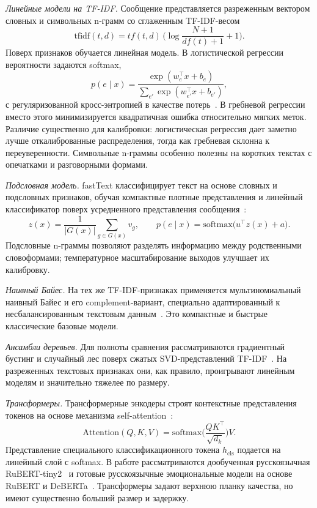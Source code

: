 \documentclass[12pt,a4paper]{report}
\begin{document}
\emph{Линейные модели на TF-IDF.} Сообщение представляется разреженным вектором словных и символьных n-грамм со сглаженным TF-IDF-весом
\[
  \mathrm{tfidf}(t,d) = tf(t,d)\,\Big(\log\frac{N+1}{df(t)+1} + 1\Big).
\]
Поверх признаков обучается линейная модель. В логистической регрессии вероятности задаются softmax,
\[
  p(e\mid x) = \frac{\exp(w_e^\top x + b_e)}{\sum_{e'} \exp(w_{e'}^\top x + b_{e'})},
\]
с регуляризованной кросс-энтропией в качестве потерь~\cite{cox1958logistic,hastie2009esl}. В гребневой регрессии вместо этого минимизируется квадратичная ошибка относительно мягких меток. Различие существенно для калибровки: логистическая регрессия дает заметно лучше откалиброванные распределения, тогда как гребневая склонна к переуверенности. Символьные n-граммы особенно полезны на коротких текстах с опечатками и разговорными формами.

\emph{Подсловная модель.} fastText классифицирует текст на основе словных и подсловных признаков, обучая компактные плотные представления и линейный классификатор поверх усредненного представления сообщения~\cite{joulin2016fasttext}:
\[
  z(x) = \frac{1}{|G(x)|}\sum_{g\in G(x)} v_g, \qquad
  p(e\mid x) = \mathrm{softmax}\big(u^\top z(x) + a\big).
\]
Подсловные n-граммы позволяют разделять информацию между родственными словоформами; температурное масштабирование выходов улучшает их калибровку.

\emph{Наивный Байес.} На тех же TF-IDF-признаках применяется мультиномиальный наивный Байес и его complement-вариант, специально адаптированный к несбалансированным текстовым данным~\cite{rennie2003nb}. Это компактные и быстрые классические базовые модели.

\emph{Ансамбли деревьев.} Для полноты сравнения рассматриваются градиентный бустинг и случайный лес поверх сжатых SVD-представлений TF-IDF~\cite{hastie2009esl}. На разреженных текстовых признаках они, как правило, проигрывают линейным моделям и значительно тяжелее по размеру.

\emph{Трансформеры.} Трансформерные энкодеры строят контекстные представления токенов на основе механизма self-attention~\cite{vaswani2017attention}:
\[
  \mathrm{Attention}(Q,K,V) = \mathrm{softmax}\!\Big(\frac{QK^\top}{\sqrt{d_k}}\Big)V.
\]
Представление специального классификационного токена \(h_{\mathrm{cls}}\) подается на линейный слой с softmax. В работе рассматриваются дообученная русскоязычная RuBERT-tiny2~\cite{kuratov2019rubert,devlin2019bert} и готовые русскоязычные эмоциональные модели на основе RuBERT и DeBERTa~\cite{he2021deberta}. Трансформеры задают верхнюю планку качества, но имеют существенно больший размер и задержку.
\end{document}
